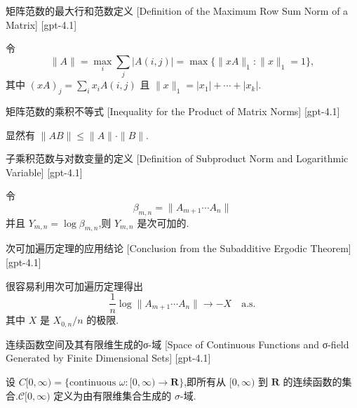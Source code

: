 \documentclass[UTF8]{ctexart}
\begin{document}
    
    
    \begin{dfn}
        {矩阵范数的最大行和范数定义}
        [Definition of the Maximum Row Sum Norm of a Matrix]
        [gpt-4.1]
        
令
\[
\|A\| = \max_{i} \sum_{j} |A(i,j)| = \max \{ \| xA \|_{1} : \| x \|_{1} = 1 \} ,
\]
其中 $(xA)_{j} = \sum_{i} x_{i} A(i,j)$ 且 $\| x \|_{1} = | x_{1} | + \cdots + | x_{k} |$.

    \end{dfn}
    
    
    
    \begin{ppt}
        {矩阵范数的乘积不等式}
        [Inequality for the Product of Matrix Norms]
        [gpt-4.1]
        
显然有 $\|AB\| \leq \|A\| \cdot \|B\|$.

    \end{ppt}
    
    
    
    \begin{dfn}
        {子乘积范数与对数变量的定义}
        [Definition of Subproduct Norm and Logarithmic Variable]
        [gpt-4.1]
        
令
\[
\beta_{m,n} = \| A_{m+1} \cdots A_{n} \|
\]
并且 $Y_{m,n} = \log \beta_{m,n}$,则 $Y_{m,n}$ 是次可加的.

    \end{dfn}
    
    
    
    \begin{thm}
        {次可加遍历定理的应用结论}
        [Conclusion from the Subadditive Ergodic Theorem]
        [gpt-4.1]
        
很容易利用次可加遍历定理得出
\[
\frac{1}{n} \log \| A_{m+1} \cdots A_{n} \| \to -X \quad \mathrm{a.s.}
\]
其中 $X$ 是 $X_{0,n}/n$ 的极限.

    \end{thm}
    
    
    
    \begin{dfn}
        {连续函数空间及其有限维生成的σ-域}
        [Space of Continuous Functions and σ-field Generated by Finite Dimensional Sets]
        [gpt-4.1]
        
设 $C[0, \infty ) = \{ \text{continuous } \omega : [ 0, \infty ) \to \mathbf{R} \}$,即所有从 $[0, \infty )$ 到 $\mathbf{R}$ 的连续函数的集合.$\mathcal{C}[0, \infty )$ 定义为由有限维集合生成的 $\sigma$-域.

    \end{dfn}
    
\end{document}
